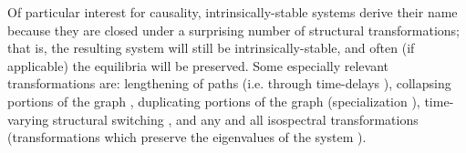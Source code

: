 \documentclass[letterpaper,10pt]{article}
\begin{document}
Of particular interest for causality, intrinsically-stable systems derive their name because they are closed under a surprising number of structural transformations; that is, the resulting system will still be intrinsically-stable, and often (if applicable) the equilibria will be preserved. Some especially relevant transformations are: lengthening of paths (i.e. through time-delays \cite{ReberIntrinsic}), collapsing portions of the graph \cite{IsospectralReduction}, duplicating portions of the graph (specialization \cite{Specialization}), time-varying structural switching \cite{Switched}, and any and all isospectral transformations (transformations which preserve the eigenvalues of the system \cite{IsospectralBook}).
\end{document}
